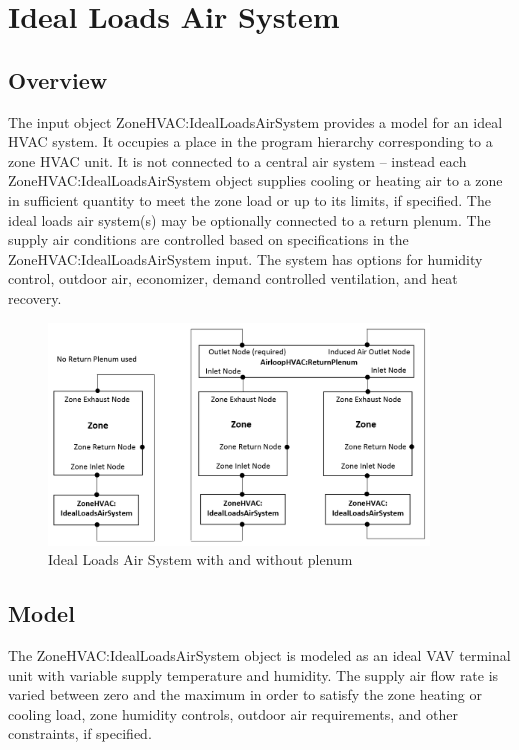 \section{Ideal Loads Air System }\label{ideal-loads-air-system}

\subsection{Overview}\label{overview-021}

The input object ZoneHVAC:IdealLoadsAirSystem provides a model for an ideal HVAC system. It occupies a place in the program hierarchy corresponding to a zone HVAC unit. It is not connected to a central air system -- instead each ZoneHVAC:IdealLoadsAirSystem object supplies cooling or heating air to a zone in sufficient quantity to meet the zone load or up to its limits, if specified. The ideal loads air system(s) may be optionally connected to a return plenum. The supply air conditions are controlled based on specifications in the ZoneHVAC:IdealLoadsAirSystem input. The system has options for humidity control, outdoor air, economizer, demand controlled ventilation, and heat recovery.

\begin{figure}[hbtp] %
\centering
\includegraphics[width=0.9\textwidth, height=0.9\textheight, keepaspectratio=true]{media/IdealLoadsSchematic.png}
\caption{Ideal Loads Air System with and without plenum \protect \label{fig:ideal-loads-air-system-with-and-without-plenum}}
\end{figure}


\subsection{Model}\label{model-002}

The ZoneHVAC:IdealLoadsAirSystem object is modeled as an ideal VAV terminal unit with variable supply temperature and humidity. The supply air flow rate is varied between zero and the maximum in order to satisfy the zone heating or cooling load, zone humidity controls, outdoor air requirements, and other constraints, if specified.

